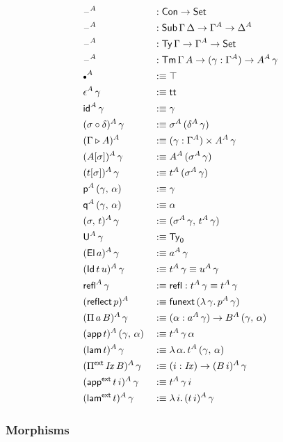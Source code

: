 \documentclass[12pt,a4paper,twoside,openany]{book}
\theoremstyle{remark}
\theoremstyle{definition}
\theoremstyle{theorem}
\newcommand{\mi}[1]{\mathit{#1}}
\newcommand{\ms}[1]{\mathsf{#1}}
\newcommand{\funext}{\ms{funext}}
\newcommand{\refl}{\mathsf{refl}}
\newcommand{\reflect}{\mathsf{reflect}}
\newcommand{\id}{\mathsf{id}}
\newcommand{\Con}{\mathsf{Con}}
\newcommand{\Sub}{\mathsf{Sub}}
\newcommand{\Tm}{\mathsf{Tm}}
\newcommand{\Ty}{\mathsf{Ty}}
\newcommand{\U}{\mathsf{U}}
\newcommand{\El}{\mathsf{El}}
\newcommand{\Id}{\mathsf{Id}}
\renewcommand{\tt}{\mathsf{tt}}
\newcommand{\blank}{\mathord{\hspace{1pt}\text{--}\hspace{1pt}}}
\newcommand{\Set}{\mathsf{Set}}
\newcommand{\ext}{\triangleright}
\newcommand{\emptycon}{\scaleobj{.75}\bullet}
\newcommand{\Pie}{\Pi^{\mathsf{ext}}}
\newcommand{\appe}{\mathsf{app^{ext}}}
\newcommand{\lame}{\mathsf{lam^{ext}}}
\newcommand{\p}{\mathsf{p}}
\newcommand{\q}{\mathsf{q}}
\newcommand{\app}{\ms{app}}
\newcommand{\lam}{\ms{lam}}
\newcommand{\defn}{:\equiv}
\begin{document}
\begin{alignat*}{3}
  &\blank^A &&: \Con \to \Set\\
  &\blank^A &&: \Sub\,\Gamma\,\Delta \to \Gamma^A \to \Delta^A\\
  &\blank^A &&: \Ty\,\Gamma \to \Gamma^A \to \Set\\
  &\blank^A &&: \Tm\,\Gamma\,A \to (\gamma : \Gamma^A) \to A^A\,\gamma\\
  &\emptycon^A &&\defn \top\\
  &\epsilon^A\,\gamma &&\defn \tt\\
  &\id^A\,\gamma &&\defn \gamma\\
  &(\sigma \circ \delta)^A\,\gamma &&\defn \sigma^A\,(\delta^A\,\gamma)\\
  &(\Gamma \ext A)^A &&\defn (\gamma : \Gamma^A) \times A^A\,\gamma\\
  &(A[\sigma])^A\,\gamma &&\defn A^A\,(\sigma^A\,\gamma)\\
  &(t[\sigma])^A\,\gamma &&\defn t^A\,(\sigma^A\,\gamma)\\
  &\p^A\,(\gamma,\,\alpha) &&\defn \gamma\\
  &\q^A\,(\gamma,\,\alpha) &&\defn \alpha\\
  &(\sigma,\,t)^A\,\gamma &&\defn (\sigma^A\,\gamma,\,t^A\,\gamma)\\
  &\U^A\,\gamma &&\defn \Ty_0\\
  &(\El\,a)^A\,\gamma &&\defn a^A\,\gamma\\
  &(\Id\,t\,u)^A\,\gamma &&\defn t^A\,\gamma \equiv u^A\,\gamma\\
  &\refl^A\,\gamma &&\defn \refl : t^A\,\gamma \equiv t^A\,\gamma\\
  &(\reflect\,p)^A &&\defn \funext\,(\lambda\,\gamma.\,p^A\,\gamma)\\
  &(\Pi\,a\,B)^A\,\gamma &&\defn (\alpha : a^A\,\gamma) \to B^A\,(\gamma,\,\alpha)\\
  &(\app\,t)^A\,(\gamma,\,\alpha) &&\defn t^A\,\gamma\,\alpha\\
  &(\lam\,t)^A\,\gamma &&\defn \lambda\,\alpha.\,t^A\,(\gamma,\,\alpha)\\
  &(\Pie\,\mi{Ix}\,B)^A\,\gamma &&\defn (i : \mi{Ix}) \to (B\,i)^A\,\gamma\\
  &(\appe\,t\,i)^A\,\gamma &&\defn t^A\,\gamma\,i\\
  &(\lame\,t)^A\,\gamma &&\defn \lambda\,i.\,(t\,i)^A\,\gamma
\end{alignat*}

\subsubsection{Morphisms}
\end{document}
